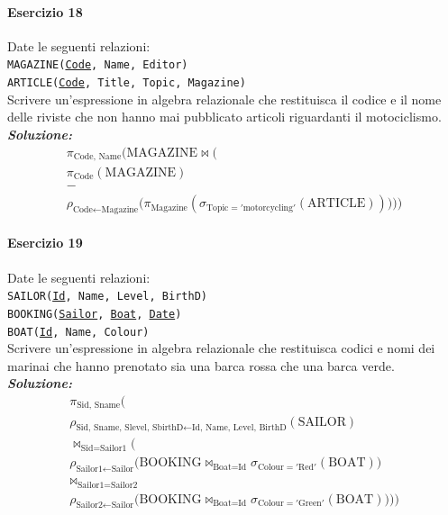 \documentclass[12pt]{extarticle}
\begin{document}
\paragraph{Esercizio 18} Date le seguenti relazioni:\\

\noindent \texttt{MAGAZINE(\underline{Code}, Name, Editor)}\\
\texttt{ARTICLE(\underline{Code}, Title, Topic, Magazine)}\\[0.5em]

\noindent Scrivere un'espressione in algebra relazionale che restituisca il codice e il nome delle riviste che non hanno mai pubblicato articoli riguardanti il motociclismo.\\

\noindent \textbf{\textit{Soluzione:}}
\[
\begin{gathered}
\pi_{\text{Code, Name}} \Big( \text{MAGAZINE} \bowtie \Big( \\
\pi_{\text{Code}}(\text{MAGAZINE}) \\
- \\
\rho_{\text{Code} \leftarrow \text{Magazine}} \big( \pi_{\text{Magazine}}(\sigma_{\text{Topic} = '\text{motorcycling}'}(\text{ARTICLE})) \big) \Big) \Big)
\end{gathered}
\]

\vspace{1em}

\paragraph{Esercizio 19} Date le seguenti relazioni:\\

\noindent \texttt{SAILOR(\underline{Id}, Name, Level, BirthD)}\\
\texttt{BOOKING(\underline{Sailor}, \underline{Boat}, \underline{Date})}\\
\texttt{BOAT(\underline{Id}, Name, Colour)}\\[0.5em]

\noindent Scrivere un'espressione in algebra relazionale che restituisca codici e nomi dei marinai che hanno prenotato sia una barca rossa che una barca verde.\\

\noindent \textbf{\textit{Soluzione:}}
\[
\begin{gathered}
\pi_{\text{Sid, Sname}} \Big( \\
\rho_{\text{Sid, Sname, Slevel, SbirthD} \leftarrow \text{Id, Name, Level, BirthD}}(\text{SAILOR}) \\
\bowtie_{\text{Sid} = \text{Sailor1}} \Big( \\
\rho_{\text{Sailor1} \leftarrow \text{Sailor}} \big( \text{BOOKING} \bowtie_{\text{Boat} = \text{Id}} \sigma_{\text{Colour} = '\text{Red}'}(\text{BOAT}) \big) \\
\bowtie_{\text{Sailor1} = \text{Sailor2}} \\
\rho_{\text{Sailor2} \leftarrow \text{Sailor}} \big( \text{BOOKING} \bowtie_{\text{Boat} = \text{Id}} \sigma_{\text{Colour} = '\text{Green}'}(\text{BOAT}) \big) \Big) \Big)
\end{gathered}
\]
\end{document}
